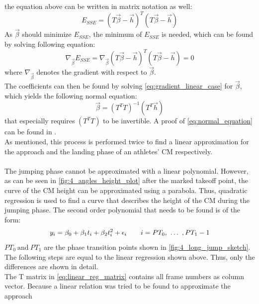 the equation above can be written in matrix notation as well:
\begin{equation}\label{eq:sse_matrix}
    E_{SSE} = (T\vec{\beta} - \vec{h})^T(T\vec{\beta} - \vec{h})
\end{equation}
As $\vec{\beta}$ should minimize $E_{SSE}$, the minimum of $E_{SSE}$ is
needed, which can be found by solving following equation:
\begin{equation}\label{eq:gradient_linear_case}
    \nabla_{\vec{\beta}}E_{SSE} = \nabla_{\vec{\beta}}(T\vec{\beta} - \vec{h})^T(T\vec{\beta} - \vec{h}) = 0
\end{equation}
where $\nabla_{\vec{\beta}}$ denotes the gradient with respect to $\vec{\beta}$.\\
The coefficients can then be found by solving
\autoref{eq:gradient_linear_case} for $\vec{\beta}$, which yields the 
following normal equation:
\begin{equation}\label{eq:normal_equation}
    \vec{\beta} = (T^T T)^{-1}(T^T\vec{h})
\end{equation}
that especially requires $(T^{T} T)$ to be invertible.
A proof of \autoref{eq:normal_equation} can be found in
\cite{proof_linear_regression_mat}.\\
As mentioned, this process is performed twice to find a linear approximation
for the approach and the landing phase of an athletes' \ac{CM} respectively.\\\\
The jumping phase cannot be approximated with a linear polynomial.
However, as can be seen in \autoref{fig:4_angles_height_plot} after the marked
takeoff point, the curve of the \ac{CM} height can be approximated using a
parabola.
Thus, quadratic regression is used to find a curve that describes the height
of the \ac{CM} during the jumping phase.
The second order polynomial that needs to be found is of the form:
\begin{equation}\label{eq:quadratic_function}
    \\y_i = \beta_0 + \beta_1t_i + \beta_2t_i^2 + \epsilon_i
    \quad\quad
    i = PT_0,\ \dots\ ,PT_1 - 1
\end{equation}
$PT_0\ \text{and}\ PT_1$ are the phase transition points shown in
\autoref{fig:4_long_jump_sketch}.
The following steps are equal to the linear regression shown above.
Thus, only the differences are shown in detail.\\
The T matrix in \autoref{eq:linear_reg_matrix} contains all frame
numbers as column vector.
Because a linear relation was tried to be found to approximate the approach
